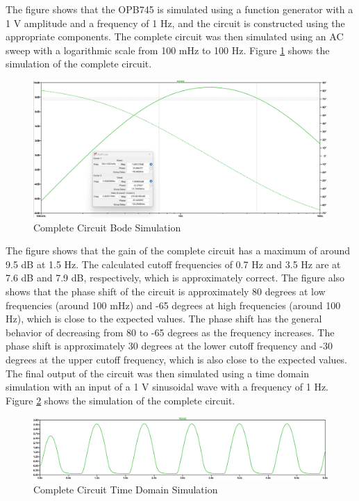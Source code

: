 \documentclass[CMPE]{KGCOEReport}
\begin{document}
The figure shows that the OPB745 is simulated using a function generator with a 1 V amplitude and a frequency of 1 Hz, and the circuit is constructed using the appropriate components. The complete circuit was then simulated using an AC sweep with a logarithmic scale from 100 mHz to 100 Hz. Figure \ref{fig:completeSim} shows the simulation of the complete circuit.

\begin{figure}[H]
    \centering
    \includegraphics[width=1\textwidth]{SimFreqOutputValues.png}
    \caption{Complete Circuit Bode Simulation}
    \label{fig:completeSim}
\end{figure}

The figure shows that the gain of the complete circuit has a maximum of around 9.5 dB at 1.5 Hz. The calculated cutoff frequencies of 0.7 Hz and 3.5 Hz are at 7.6 dB and 7.9 dB, respectively, which is approximately correct. The figure also shows that the phase shift of the circuit is approximately 80 degrees at low frequencies (around 100 mHz) and -65 degrees at high frequencies (around 100 Hz), which is close to the expected values. The phase shift has the general behavior of decreasing from 80 to -65 degrees as the frequency increases. The phase shift is approximately 30 degrees at the lower cutoff frequency and -30 degrees at the upper cutoff frequency, which is also close to the expected values.\\

The final output of the circuit was then simulated using a time domain simulation with an input of a 1 V sinusoidal wave with a frequency of 1 Hz. Figure \ref{fig:timeSim} shows the simulation of the complete circuit.

\begin{figure}[H]
    \centering
    \includegraphics[width=1\textwidth]{SimTimeOutput.png}
    \caption{Complete Circuit Time Domain Simulation}
    \label{fig:timeSim}
\end{figure}
\end{document}

